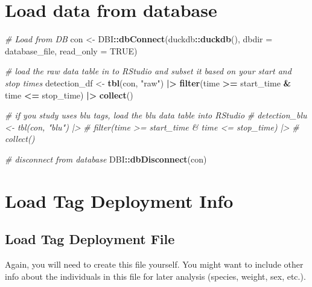 \documentclass[
]{book}
\newenvironment{Shaded}{\begin{snugshade}}{\end{snugshade}}
\newcommand{\AttributeTok}[1]{\textcolor[rgb]{0.13,0.29,0.53}{#1}}
\newcommand{\CommentTok}[1]{\textcolor[rgb]{0.56,0.35,0.01}{\textit{#1}}}
\newcommand{\ConstantTok}[1]{\textcolor[rgb]{0.56,0.35,0.01}{#1}}
\newcommand{\FunctionTok}[1]{\textcolor[rgb]{0.13,0.29,0.53}{\textbf{#1}}}
\newcommand{\NormalTok}[1]{#1}
\newcommand{\OtherTok}[1]{\textcolor[rgb]{0.56,0.35,0.01}{#1}}
\newcommand{\SpecialCharTok}[1]{\textcolor[rgb]{0.81,0.36,0.00}{\textbf{#1}}}
\newcommand{\StringTok}[1]{\textcolor[rgb]{0.31,0.60,0.02}{#1}}
\begin{document}
\section{Load data from database}\label{load-data-from-database-1}

\begin{Shaded}
\begin{Highlighting}[]
\CommentTok{\# Load from DB}
\NormalTok{con }\OtherTok{\textless{}{-}}\NormalTok{ DBI}\SpecialCharTok{::}\FunctionTok{dbConnect}\NormalTok{(duckdb}\SpecialCharTok{::}\FunctionTok{duckdb}\NormalTok{(), }
                      \AttributeTok{dbdir =}\NormalTok{ database\_file, }
                      \AttributeTok{read\_only =} \ConstantTok{TRUE}\NormalTok{)}

\CommentTok{\# load the raw data table in to RStudio and subset it based on your start and stop times}
\NormalTok{detection\_df }\OtherTok{\textless{}{-}} \FunctionTok{tbl}\NormalTok{(con, }\StringTok{"raw"}\NormalTok{) }\SpecialCharTok{|\textgreater{}} 
  \FunctionTok{filter}\NormalTok{(time }\SpecialCharTok{\textgreater{}=}\NormalTok{ start\_time }\SpecialCharTok{\&}\NormalTok{ time }\SpecialCharTok{\textless{}=}\NormalTok{ stop\_time) }\SpecialCharTok{|\textgreater{}}
  \FunctionTok{collect}\NormalTok{()}

\CommentTok{\# if you study uses blu tags, load the blu data table into RStudio}
\CommentTok{\# detection\_blu \textless{}{-} tbl(con, "blu") |\textgreater{} }
\CommentTok{\#   filter(time \textgreater{}= start\_time \& time \textless{}= stop\_time) |\textgreater{}}
\CommentTok{\#   collect()}

\CommentTok{\# disconnect from database}
\NormalTok{DBI}\SpecialCharTok{::}\FunctionTok{dbDisconnect}\NormalTok{(con)}
\end{Highlighting}
\end{Shaded}

\section{Load Tag Deployment Info}\label{load-tag-deployment-info}

\subsection{Load Tag Deployment File}\label{load-tag-deployment-file}

Again, you will need to create this file yourself. You might want to include other info about the individuals in this file for later analysis (species, weight, sex, etc.).
\end{document}
